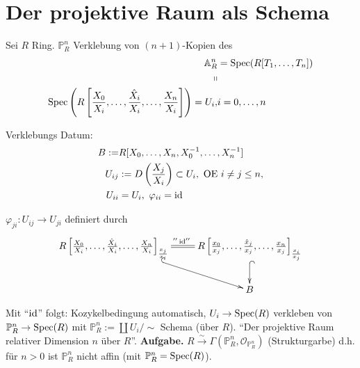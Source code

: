 \section{Der projektive Raum als Schema }

Sei $R$ Ring. $\mathbb{P}_{R}^{n}$ Verklebung von $(n+1)$-Kopien
des 
\begin{align*}
  \mathbb{A}_{R}^{n} & =\operatorname{Spec}(R[T_{1},\ldots,T_{n}])\\
  \shortparallel\\
  \operatorname{Spec}\left(R\left[\frac{X_{0}}{X_{i}},\ldots,\frac{\hat{X}_{i}}{X_{i}},\ldots,\frac{X_{n}}{X_{i}}\right]\right)=U_{i}, & i=0,\ldots,n
\end{align*}

Verklebungs Datum:
\begin{align*}
  B:= & R[X_{0},\ldots,X_{n},X_{0}^{-1},\ldots,X_{n}^{-1}]\\
  U_{ij} & :=D\left(\frac{X_{j}}{X_{i}}\right)\subset U_{i},\ \text{OE}\ i\neq j\leq n,\\
  U_{ii} & =U_{i},\ \varphi_{ii}=\id
\end{align*}

$\varphi_{ji}:U_{ij}\rightarrow U_{ji}$ definiert durch
\[
  \xymatrix{R\left[\frac{X_{0}}{X_{i}},\ldots,\frac{\hat{X}_{i}}{X_{i}},\ldots,\frac{X_{n}}{X_{i}}\right]_{\frac{x_{j}}{x_{i}}}\ar@{=}[r]^{''\id''}\ar@{^{(}->}[dr] & R\left[\frac{x_{0}}{x_{j}},\ldots,\frac{\hat{x}_{j}}{x_{j}},\ldots,\frac{x_{n}}{x_{j}}\right]_{\frac{x_{i}}{x_{j}}}\ar@{^{(}->}[d]\\
    & B
  }
\]

Mit ``$\operatorname{\mathrm{id}}$'' folgt: Kozykelbedingung automatisch, $U_{i}\rightarrow\operatorname{Spec}(R)$
verkleben von $\mathbb{P}_{R}^{n}\rightarrow\operatorname{Spec}(R)$ mit $\mathbb{P}_{R}^{n}:=\coprod U_{i}/\sim$
Schema (über $R$). ``Der projektive Raum relativer Dimension $n$
über $R$''.
\textbf{Aufgabe.}
$R\xrightarrow{\sim}\Gamma(\mathbb{P}_{R}^{n},\mathcal{O}_{\mathbb{P}_{R}^{n}})$
(Strukturgarbe) d.h. für $n>0$ ist $\mathbb{P}_{R}^{n}$ nicht affin (mit
$\mathbb{P}_{R}^{n}=\operatorname{Spec}(R)$).
